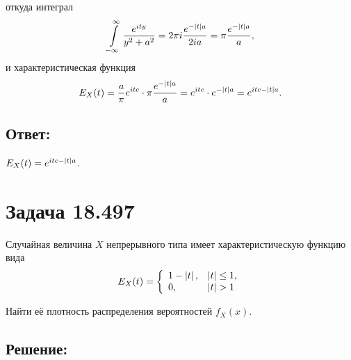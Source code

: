 откуда интеграл
\begin{equation}
    \int \limits_{-\infty}^\infty \frac{e^{ity}}{y^2 + a^2}
    = 2 \pi i \frac{e^{- \left | t \right | a}}{2 i a}
    = \pi \frac{e^{- \left | t \right | a}}{a},
\end{equation}
и характеристическая функция
\begin{equation}
    E_X(t)
    = \frac{a}{\pi} e^{itc} \cdot \pi \frac{e^{- \left | t \right | a}}{a}
    = e^{itc} \cdot e^{- \left | t \right | a}
    = e^{itc - \left | t \right | a} .
\end{equation}

\subsection*{Ответ:}
$E_X(t) = e^{itc - \left | t \right | a}$.

\section*{Задача 18.497}

Случайная величина $X$ непрерывного типа имеет характеристическую функцию вида
\[
    E_X(t)
    = \left \{
    \begin{array}{ll}
        1 - \left | t \right |, & \left | t \right | \le 1 , \\
        0,               & \left | t \right | > 1
    \end{array}
    \right .
\]

Найти её плотность распределения вероятностей $f_X(x)$.

\subsection*{Решение:}

